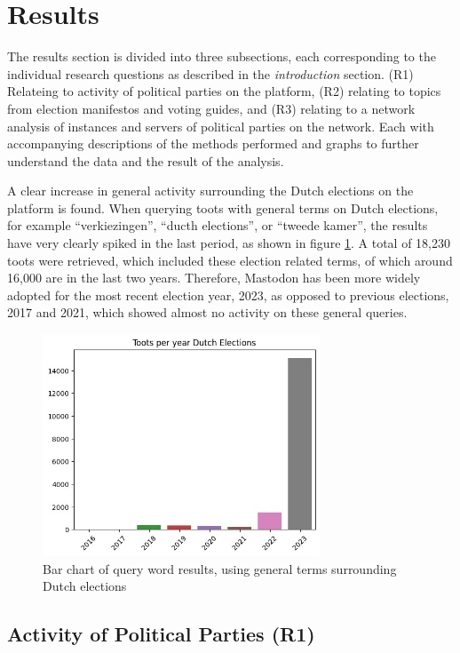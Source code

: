 \section{Results}
The results section is divided into three subsections, each corresponding to the individual research questions as described in the \textit{introduction} section. (R1) Relateing to activity of political parties on the platform, (R2) relating to topics from election manifestos and voting guides, and (R3) relating to a network analysis of instances and servers of political parties on the network. Each with accompanying descriptions of the methods performed and graphs to further understand the data and the result of the analysis.

A clear increase in general activity surrounding the Dutch elections on the platform is found.
When querying toots with general terms on Dutch elections, for example “verkiezingen”, “ducth elections”, or “tweede kamer”, the results have very clearly spiked in the last period, as shown in figure \ref{fig:electionstotal}. A total of 18,230 toots were retrieved, which included these election related terms, of which around 16,000 are in the last two years.
Therefore, Mastodon has been more widely adopted for the most recent election year, 2023, as opposed to previous elections, 2017 and 2021, which showed almost no activity on these general queries.

\begin{figure}[ht]
  \centering
  \includegraphics[width=3.25in]{media/dutch-elections-mastodon.jpeg}
  \caption{Bar chart of query word results, using general terms surrounding Dutch elections}
  \label{fig:electionstotal}
\end{figure}

\subsection{Activity of Political Parties (R1)}

